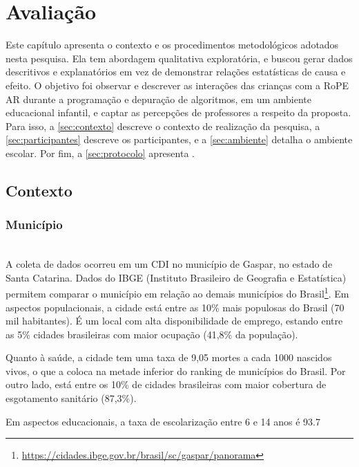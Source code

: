 \chapter{Avaliação}
\label{c_avaliacao}
Este capítulo apresenta o contexto e os procedimentos metodológicos adotados nesta pesquisa. Ela tem abordagem qualitativa exploratória, e buscou gerar dados descritivos e explanatórios em vez de demonstrar relações estatísticas de causa e efeito.
O objetivo foi observar e descrever as interações das crianças com a RoPE AR durante a programação e depuração de algoritmos, em um ambiente educacional infantil, e captar as percepções de professores a respeito da proposta. Para isso, a \autoref{sec:contexto} descreve o contexto de realização da pesquisa, a \autoref{sec:participantes} descreve os participantes, e a \autoref{sec:ambiente} detalha o ambiente escolar. Por fim, a \autoref{sec:protocolo} apresenta .
 
\section{Contexto}
\label{sec:contexto}
\subsection{Município}\\
A coleta de dados ocorreu em um \ac{CDI} no município de Gaspar, no estado de Santa Catarina. Dados do IBGE (Instituto Brasileiro de Geografia e Estatística) permitem comparar o município em relação ao demais municípios do Brasil\footnote{\url{https://cidades.ibge.gov.br/brasil/sc/gaspar/panorama}}. Em aspectos populacionais, a cidade está entre as 10\% mais populosas do Brasil (70 mil habitantes). É um local com alta disponibilidade de emprego, estando entre as 5\% cidades brasileiras com maior ocupação (41,8\% da população).
 
Quanto à saúde, a cidade tem uma taxa de 9,05 mortes a cada 1000 nascidos vivos, o que a coloca na metade inferior do ranking de municípios do Brasil. Por outro lado, está entre os 10\% de cidades brasileiras com maior cobertura de esgotamento sanitário (87,3\%).
 
Em aspectos educacionais, a taxa de escolarização entre 6 e 14 anos é 93.7%
 
